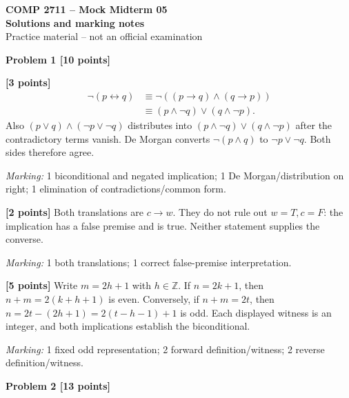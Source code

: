 \documentclass[12pt,letterpaper]{article}
\newcommand{\problemheading}[2][5\baselineskip]{\Needspace{#1}\par\noindent\hspace*{-0.625in}\textbf{#2}\par\nobreak\vspace{0.3em}}
\begin{document}
\begin{center}\textbf{COMP 2711 -- Mock Midterm 05}\\{\large\bfseries Solutions and marking notes}\\Practice material -- not an official examination\end{center}\vspace{0.5em}
\problemheading[\dimexpr 3\baselineskip+4\baselineskip\relax]{Problem 1 [10 points]}
\begin{description}[font=\normalfont,leftmargin=1.2em,labelsep=0.4em]
\item[(a)] \textbf{[3 points]} \[\begin{aligned}\neg(p\leftrightarrow q)&\equiv\neg((p\to q)\land(q\to p))\\&\equiv(p\land\neg q)\lor(q\land\neg p).\end{aligned}\] Also $(p\lor q)\land(\neg p\lor\neg q)$ distributes into $(p\land\neg q)\lor(q\land\neg p)$ after the contradictory terms vanish. De Morgan converts $\neg(p\land q)$ to $\neg p\lor\neg q$. Both sides therefore agree.
\par\textit{Marking:} 1 biconditional and negated implication; 1 De Morgan/distribution on right; 1 elimination of contradictions/common form.
\item[(b)] \textbf{[2 points]} Both translations are $c\to w$. They do not rule out $w=T,c=F$: the implication has a false premise and is true. Neither statement supplies the converse.
\par\textit{Marking:} 1 both translations; 1 correct false-premise interpretation.
\item[(c)] \textbf{[5 points]} Write $m=2h+1$ with $h\in\mathbb Z$. If $n=2k+1$, then $n+m=2(k+h+1)$ is even. Conversely, if $n+m=2t$, then $n=2t-(2h+1)=2(t-h-1)+1$ is odd. Each displayed witness is an integer, and both implications establish the biconditional.
\par\textit{Marking:} 1 fixed odd representation; 2 forward definition/witness; 2 reverse definition/witness.
\end{description}
\vspace{0.65em}
\problemheading[\dimexpr 3\baselineskip+4\baselineskip\relax]{Problem 2 [13 points]}
\end{document}
